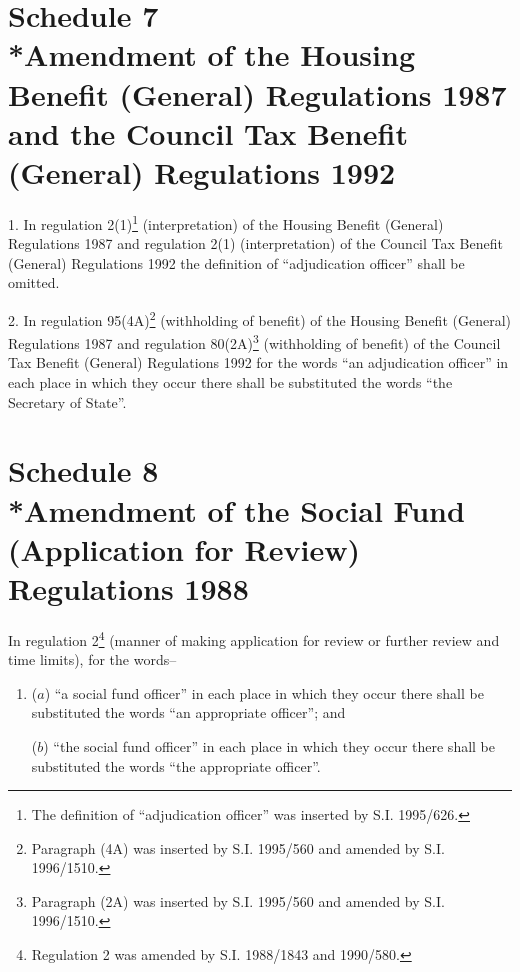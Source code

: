 \documentclass[12pt,a4paper]{article}
\begin{document}
\part[Schedule 7 --- Amendment of the Housing Benefit (General) Regulations 1987 and the Council Tax Benefit (General) Regulations 1992]{Schedule 7\\*Amendment of the Housing Benefit (General) Regulations 1987 and the Council Tax Benefit (General) Regulations 1992}

\renewcommand\parthead{--- Schedule 7}

1.  In regulation 2(1)\footnote{\frenchspacing The definition of “adjudication officer” was inserted by S.I. 1995/626.\label{fn:82}} (interpretation) of the Housing Benefit (General) Regulations 1987 and regulation 2(1) (interpretation) of the Council Tax Benefit (General) Regulations 1992 the definition of “adjudication officer” shall be omitted.

\medskip

2.  In regulation 95(4A)\footnote{\frenchspacing Paragraph (4A) was inserted by S.I. 1995/560 and amended by S.I. 1996/1510.} (withholding of benefit) of the Housing Benefit (General) Regulations 1987 and regulation 80(2A)\footnote{\frenchspacing Paragraph (2A) was inserted by S.I. 1995/560 and amended by S.I. 1996/1510.} (withholding of benefit) of the Council Tax Benefit (General) Regulations 1992 for the words “an adjudication officer” in each place in which they occur there shall be substituted the words “the Secretary of State”.

\part[Schedule 8 --- Amendment of the Social Fund (Application for Review) Regulations 1988]{Schedule 8\\*Amendment of the Social Fund (Application for Review) Regulations 1988}

\renewcommand\parthead{--- Schedule 8}

In regulation 2\footnote{\frenchspacing Regulation 2 was amended by S.I. 1988/1843 and 1990/580.} (manner of making application for review or further review and time limits), for the words–
\begin{enumerate}\item[]
($a$) “a social fund officer” in each place in which they occur there shall be substituted the words “an appropriate officer”; and

($b$) “the social fund officer” in each place in which they occur there shall be substituted the words “the appropriate officer”.
\end{enumerate}
\end{document}
